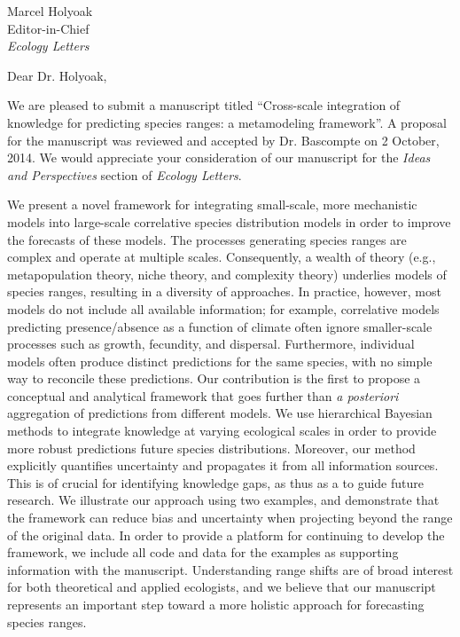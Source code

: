 \documentclass[11pt]{letter}
\begin{document}

\begin{letter}{Marcel Holyoak \\ 
	Editor-in-Chief \\
	\emph{Ecology Letters}
}
\opening{Dear Dr. Holyoak,}

We are pleased to submit a manuscript titled ``Cross-scale integration of knowledge for predicting species ranges: a metamodeling framework''. 
A proposal for the manuscript was reviewed and accepted by Dr. Bascompte on 2 October, 2014. 
We would appreciate your consideration of our manuscript for the \emph{Ideas and Perspectives} section of \emph{Ecology Letters}.

We present a novel framework for integrating small-scale, more mechanistic models into large-scale correlative species distribution models in order to improve the forecasts of these models.
The processes generating species ranges are complex and operate at multiple scales.
Consequently, a wealth of theory (e.g., metapopulation theory, niche theory, and complexity theory) underlies models of species ranges, resulting in a diversity of approaches.
In practice, however, most models do not include all available information; for example, correlative models predicting presence/absence as a function of climate often ignore smaller-scale processes such as growth, fecundity, and dispersal.
Furthermore, individual models often produce distinct predictions for the same species, with no simple way to reconcile these predictions.
Our contribution is the first to propose a conceptual and analytical framework that goes further than \emph{a posteriori} aggregation of predictions from different models. 
We use hierarchical Bayesian methods to integrate knowledge at varying ecological scales in order to provide more robust predictions future species distributions.
Moreover, our method explicitly quantifies uncertainty and propagates it from all information sources.
This is of crucial for identifying knowledge gaps, as thus as a to guide future research.
We illustrate our approach using two examples, and demonstrate that the framework can reduce bias and uncertainty when projecting beyond the range of the original data.
In order to provide a platform for continuing to develop the framework, we include all code and data for the examples as supporting information with the manuscript.
Understanding range shifts are of broad interest for both theoretical and applied ecologists, and we believe that our manuscript represents an important step toward a more holistic approach for forecasting species ranges.


\end{letter}
\end{document}
